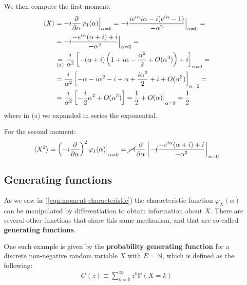 \documentclass[../template.tex]{subfiles}
\begin{document}
\begin{exo}
\begin{enumerate}[label=\alph*.]
        \medskip

        We then compute the first moment:
        \begin{align*}
            \langle X \rangle &= -i \pdv{\alpha} \varphi_{1}(\alpha) \Big|_{\alpha = 0} = -i \frac{i e^{i \alpha} i \alpha - i (e^{i \alpha} - 1)}{- \alpha^2} \Big|_{\alpha = 0} = \\
            &= -i \frac{-e^{i \alpha} ( \alpha + i) + i}{- \alpha^2}\Big|_{\alpha = 0} =\\
            &\underset{(a)}{=}  \frac{i}{\alpha^2}\left[-(\alpha + i) \left(1+i \alpha - \frac{\alpha^2}{2} + O(\alpha^3) \right) + i\right]_{\alpha=0} =\\
            &=\frac{i}{\alpha^2} \left[-\alpha -i \alpha^2 -i +\alpha + \frac{i \alpha^2}{2} +i +O(\alpha^3)  \right]_{\alpha=0} =\\
            &= \frac{i}{\alpha^2} \left[-\frac{i}{2} \alpha^2  + O(\alpha^3)\right]  = \frac{1}{2} + O(\alpha) \Big|_{\alpha= 0} = \frac{1}{2}  
        \end{align*}
        where in (a) we expanded in series the exponential.

        \medskip

        For the second moment:
        \begin{align*}
            \langle X^2 \rangle = \left(-i \pdv{\alpha}\right)^2 \varphi_1(\alpha) \Big|_{\alpha=0}= \cancel{-i}\pdv{\alpha} \left[-\cancel{i} \frac{- e^{i \alpha} (\alpha + i) + i}{- \alpha^2} \right]_{\alpha=0}
        \end{align*}
    \end{enumerate} 
\end{exo}

\subsection{Generating functions}
As we saw in (\ref{eqn:moment-characteristic}) the characteristic function $\varphi_X(\alpha)$ can be manipulated by differentiation to obtain information about $X$. There are several other functions that share this same mechanism, and that are so-called \textbf{generating functions}. 

\medskip

One such example is given by the \textbf{probability generating function} for a discrete non-negative random variable $X$ with $E = \mathbb{N}$, which is defined as the following:
\begin{align}\label{eqn:pgenerating}
    G(z) \equiv \sum_{k=0}^{\infty} z^k \mathbb{P}(X=k)
\end{align} 
\end{document}
